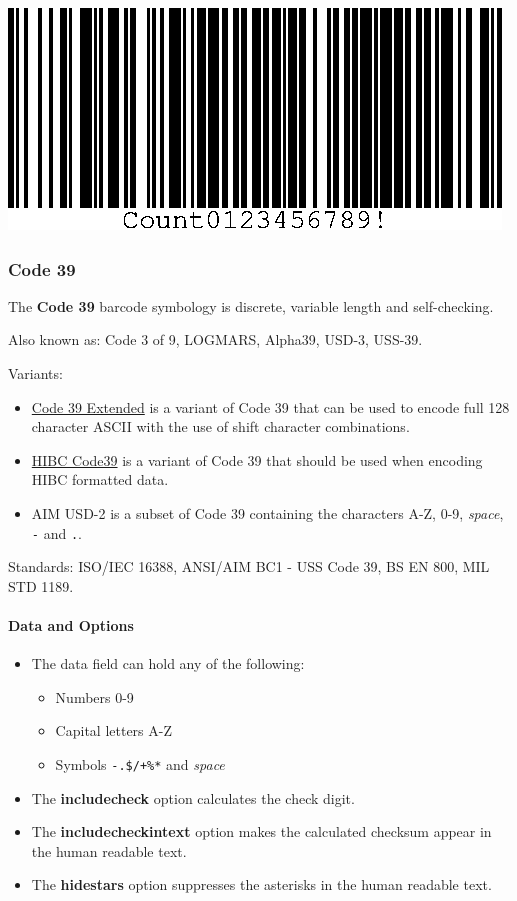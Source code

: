 \includegraphics{images/code128-1.eps}

\hypertarget{code-39}{%
\subsubsection{Code 39}\label{code-39}}

The \textbf{Code 39} barcode symbology is discrete, variable length and
self-checking.

Also known as: Code 3 of 9, LOGMARS, Alpha39, USD-3, USS-39.

Variants:

\begin{itemize}
\tightlist
\item
  \protect\hyperlink{code-39-extended}{Code 39 Extended} is a variant of
  Code 39 that can be used to encode full 128 character ASCII with the
  use of shift character combinations.
\item
  \protect\hyperlink{hibc-symbols}{HIBC Code39} is a variant of Code 39
  that should be used when encoding HIBC formatted data.
\item
  AIM USD-2 is a subset of Code 39 containing the characters A-Z, 0-9,
  \emph{space}, \texttt{-} and \texttt{.}.
\end{itemize}

Standards: ISO/IEC 16388, ANSI/AIM BC1 - USS Code 39, BS EN 800, MIL STD
1189.

\hypertarget{data-and-options-20}{%
\paragraph{Data and Options}\label{data-and-options-20}}

\begin{itemize}
\tightlist
\item
  The data field can hold any of the following:

  \begin{itemize}
  \tightlist
  \item
    Numbers 0-9
  \item
    Capital letters A-Z
  \item
    Symbols \texttt{-.\$/+\%*} and \emph{space}
  \end{itemize}
\item
  The \textbf{includecheck} option calculates the check digit.
\item
  The \textbf{includecheckintext} option makes the calculated checksum
  appear in the human readable text.
\item
  The \textbf{hidestars} option suppresses the asterisks in the human
  readable text.
\end{itemize}

